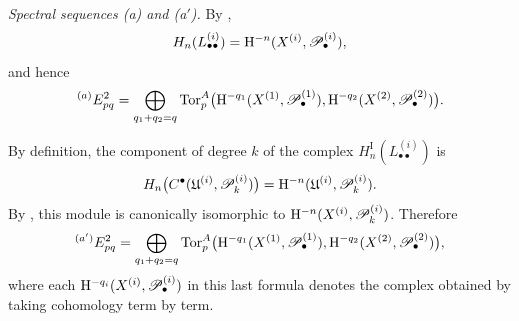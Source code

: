 \begin{env}[6.6.3]
\label{III.6.6.3}
\emph{Spectral sequences \textnormal{(a)} and
\textnormal{(a$'$)}.}
By ,
\[
  H_n(L_{\bullet\bullet}^{(i)})
  =
  \mathrm{H}^{-n}(X^{(i)},\mathscr{P}_\bullet^{(i)}),
\]
and hence
\[
  {}^{(a)}E_{pq}^2
  =
  \bigoplus_{q_1+q_2=q}
  \operatorname{Tor}_p^A
  \bigl(
    \mathrm{H}^{-q_1}(X^{(1)},\mathscr{P}_\bullet^{(1)}),
    \mathrm{H}^{-q_2}(X^{(2)},\mathscr{P}_\bullet^{(2)})
  \bigr).
\]

By definition, the component of degree $k$ of the complex
$H_n^{\mathrm I}(L_{\bullet\bullet}^{(i)})$ is
\[
  H_n\bigl(
    C^\bullet(\mathfrak U^{(i)},\mathscr{P}_k^{(i)})
  \bigr)
  =
  \mathrm{H}^{-n}(\mathfrak U^{(i)},\mathscr{P}_k^{(i)}).
\]
By , this module is canonically isomorphic to
$\mathrm{H}^{-n}(X^{(i)},\mathscr{P}_k^{(i)})$.  Therefore
\[
  {}^{(a')}E_{pq}^2
  =
  \bigoplus_{q_1+q_2=q}
  \operatorname{Tor}_p^A
  \bigl(
    \mathrm{H}^{-q_1}(X^{(1)},\mathscr{P}_\bullet^{(1)}),
    \mathrm{H}^{-q_2}(X^{(2)},\mathscr{P}_\bullet^{(2)})
  \bigr),
\]
where each $\mathrm{H}^{-q_i}(X^{(i)},\mathscr{P}_\bullet^{(i)})$ in this
last formula denotes the complex obtained by taking cohomology
term by term.
\end{env}

